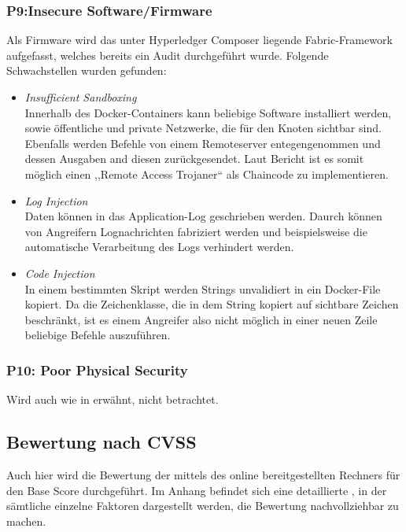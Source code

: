         \subsubsection*{P9:Insecure Software/Firmware}
            Als Firmware wird das unter Hyperledger Composer liegende Fabric-Framework aufgefasst, welches bereits ein Audit\cite{Shaw2017} durchgeführt wurde. 
            Folgende Schwachstellen wurden gefunden:
            \begin{itemize}[leftmargin=0cm,label={}]
    	        \item \emph{Insufficient Sandboxing}\cite{Shaw2017}\label{vuln:fabric_sandbox}\\
    	            Innerhalb des Docker-Containers kann beliebige Software installiert werden, sowie öffentliche und private Netzwerke, die für den Knoten sichtbar sind. 
    	            Ebenfalls werden Befehle von einem Remoteserver entegengenommen und dessen Ausgaben and diesen zurückgesendet. 
    	            Laut Bericht ist es somit möglich einen ,,Remote Access Trojaner`` als Chaincode zu implementieren.
    	        \item \emph{Log Injection}\cite{Shaw2017}\label{vuln:fabric_log_injection}\\
    	            Daten können in das Application-Log geschrieben werden.
    	            Daurch können von Angreifern Lognachrichten fabriziert werden und beispielsweise die automatische Verarbeitung des Logs verhindert werden. 
    	        \item \emph{Code Injection}\cite{Shaw2017}\label{vuln:fabric_code_injection}\\
    	            In einem bestimmten Skript werden Strings unvalidiert in ein Docker-File kopiert. 
    	            Da die Zeichenklasse, die in dem String kopiert auf sichtbare Zeichen beschränkt, ist es einem Angreifer also nicht möglich in einer neuen Zeile beliebige Befehle auszuführen.
            \end{itemize}
            
        \subsubsection*{P10: Poor Physical Security}
            Wird auch wie in  erwähnt, nicht betrachtet.
    
    \subsection{Bewertung nach CVSS}
    \label{sec:evaluation_cvss}
        Auch hier wird die Bewertung der  mittels des online bereitgestellten Rechners\cite{CvssCalc} für den Base Score durchgeführt. 
    	Im Anhang befindet sich eine detaillierte , in der sämtliche einzelne Faktoren dargestellt werden, die Bewertung nachvollziehbar zu machen.
    
